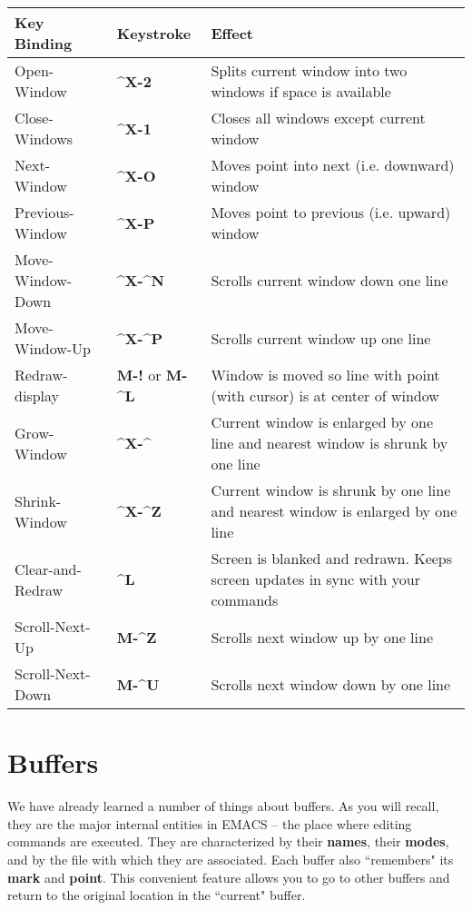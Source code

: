 \begin{tabular}{llp{280pt}}
Key Binding & Keystroke & Effect \\ \hline

Open-Window & {\bf{}\^{}X-2} & Splits current window into two windows
if space is available \\

Close-Windows & {\bf{}\^{}X-1} & Closes all windows except current
window \\

Next-Window & {\bf{}\^{}X-O} & Moves point into next (i.e. downward)
window \\

Previous-Window & {\bf{}\^{}X-P}  & Moves point to previous (i.e. upward)
window \\

Move-Window-Down & {\bf{}\^{}X-\^{}N} & Scrolls current window down
one line \\

Move-Window-Up & {\bf{}\^{}X-\^{}P} & Scrolls current window up one line \\

Redraw-display & {\bf{}M-!} or {\bf{}M-\^{}L} & Window is moved so
line with point (with cursor) is at center of window \\

Grow-Window & {\bf{}\^{}X-\^{}} & Current window is enlarged by one
line and nearest window is shrunk by
one line \\

Shrink-Window & {\bf{}\^{}X-\^{}Z}  & Current window is shrunk by one line
and nearest window is enlarged by one
line \\

Clear-and-Redraw & {\bf{}\^{}L} & Screen is blanked and redrawn.  Keeps
screen updates in sync with your
commands \\

Scroll-Next-Up & {\bf{}M-\^{}Z}  & Scrolls next window up by one line \\

Scroll-Next-Down & {\bf{}M-\^{}U}  & Scrolls next window down by one line \\

\end{tabular}

\chapter{Buffers}

 We have already learned a number of things about
buffers.  As you will recall, they are the major internal entities in
EMACS -- the place where editing commands are executed.  They are
characterized by their {\bf{}names}, their {\bf{}modes}, and by the
file with which they are associated.  Each buffer also ``remembers"
its {\bf{}mark} and {\bf{}point}.  This convenient feature allows you
to go to other buffers and return to the original location in the
``current" buffer.

